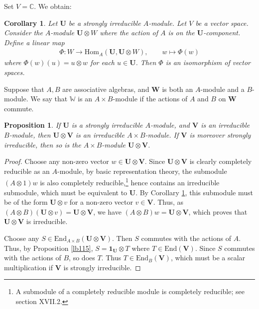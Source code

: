 \documentclass[12pt,a4paper,notitlepage]{report}
\theoremstyle{definition}
\theoremstyle{plain}
\newtheorem{pp}[df]{Proposition}
\newtheorem{co}[df]{Corollary}
\newcommand{\End}{\mathrm{End}} %
\newcommand{\id}{\mathbf{1}}
\newcommand{\Hom}{\mathrm{Hom}}
\newcommand{\mbf}{\mathbf}
\newcommand{\Wbb}{\mathbb W}
\newcommand{\Cbb}{\mathbb C}
\numberwithin{equation}{section}
\begin{document}
Set $V=\Cbb$. We obtain:

\begin{co}\label{lb107}
Let $\mbf U$ be a strongly irreducible $A$-module. Let $V$ be a vector space. Consider the $A$-module $\mbf U\otimes W$ where the action of $A$ is on the $\mbf U$-component. Define a linear  map
\begin{align*}
\Phi:W\rightarrow \Hom_A(\mbf U,\mbf U\otimes W),\qquad w\mapsto \Phi(w)
\end{align*}
where $\Phi(w)(u)=u\otimes w$ for each $u\in\mbf U$. Then $\Phi$ is an isomorphism of vector spaces.
\end{co}




Suppose that $A,B$ are associative algebras, and $\mbf W$ is both an $A$-module and a $B$-module. We say that $\Wbb$ is an $A\times B$-module if the actions of $A$ and $B$ on $\mbf W$ commute.



\begin{pp}\label{lb113}
If $\mbf U$ is a strongly irreducible $A$-module, and $\mbf V$ is an irreducible $B$-module, then $\mbf U\otimes \mbf V$ is an irreducible $A\times B$-module. If $\mbf V$ is moreover strongly irreducible, then so is the $A\times B$-module $\mbf U\otimes \mbf V$.
\end{pp}

\begin{proof}
Choose any non-zero vector $w\in\mbf U\otimes\mbf V$. Since $\mbf U\otimes\mbf V$ is clearly completely reducible as an $A$-module, by basic representation theory, the submodule $(A\otimes 1)w$ is also completely reducible,\footnote{A submodule of a completely reducible module is completely reducible; see \cite{Lang} section XVII.2.} hence contains an irreducible submodule, which must be equivalent to $\mbf U$. By Corollary \ref{lb107}, this submodule must be of the form $\mbf U\otimes v$ for a non-zero vector $v\in\mbf V$. Thus, as $(A\otimes B)(\mbf U\otimes v)=\mbf U\otimes \mbf V$, we have $(A\otimes B)w=\mbf U\otimes \mbf V$, which proves that $\mbf U\otimes\mbf V$ is irreducible.

Choose any $S\in\End_{A\times B}(\mbf U\otimes\mbf V)$. Then $S$ commutes with the actions of $A$. Thus, by Proposition \ref{lb115}, $S=\id_{\mbf U}\otimes T$ where $T\in\End(\mbf V)$. Since $S$ commutes with the actions of $B$, so does $T$. Thus $T\in\End_B(\mbf V)$, which must be a scalar multiplication if $\mbf V$ is strongly irreducible.
\end{proof}
\end{document}
